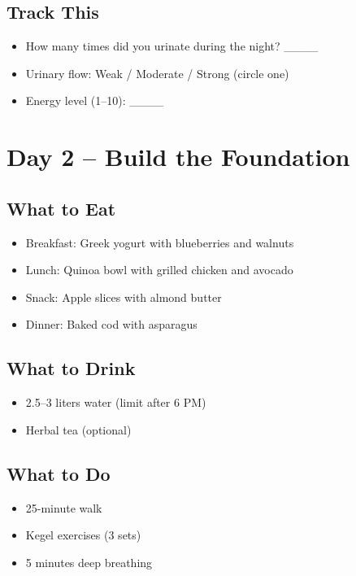 \documentclass[11pt,oneside]{book}
\begin{document}
\section*{Track This}
\begin{itemize}[leftmargin=*]
\item How many times did you urinate during the night? \_\_\_\_
\item Urinary flow: Weak / Moderate / Strong (circle one)
\item Energy level (1--10): \_\_\_\_
\end{itemize}

\clearpage
\chapter*{Day 2 – Build the Foundation}

\section*{What to Eat}
\begin{itemize}[leftmargin=*]
\item Breakfast: Greek yogurt with blueberries and walnuts
\item Lunch: Quinoa bowl with grilled chicken and avocado
\item Snack: Apple slices with almond butter
\item Dinner: Baked cod with asparagus
\end{itemize}

\section*{What to Drink}
\begin{itemize}[leftmargin=*]
\item 2.5--3 liters water (limit after 6 PM)
\item Herbal tea (optional)
\end{itemize}

\section*{What to Do}
\begin{itemize}[leftmargin=*]
\item 25-minute walk
\item Kegel exercises (3 sets)
\item 5 minutes deep breathing
\end{itemize}
\end{document}
